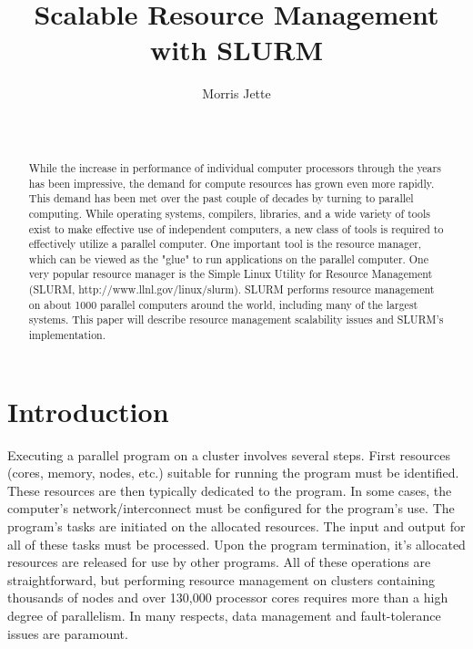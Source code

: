 \documentclass{../common/acm}
\def\ctit{Scalable Resource Management with SLURM}
\def\ucrl{UCRL-JC-TBD}
\def\auth{Morris Jette}
\def\pubdate{January 23, 2006}
\def\journal{Operating Systems Reviews}
\begin{document}

\title{\ctit}
\author{
\alignauthor Morris Jette\\
	\\
	\\
}

\maketitle
\begin{abstract}
While the increase in performance of individual computer
processors through the years has been impressive, the demand
for compute resources has grown even more rapidly.
This demand has been met over the past couple of decades by
turning to parallel computing.
While operating systems, compilers, libraries, and a wide
variety of tools exist to make effective use of independent
computers, a new class of tools is required to effectively
utilize a parallel computer.
One important tool is the resource manager, which can be viewed
as the "glue" to run applications on the parallel computer.
One very popular resource manager is the Simple Linux
Utility for Resource Management (SLURM,
http://www.llnl.gov/linux/slurm).
SLURM performs resource management on about 1000 parallel
computers around the world, including many of the largest
systems.
This paper will describe resource management scalability
issues and SLURM's implementation.
\end{abstract}


\section{Introduction}

Executing a parallel program on a cluster involves several
steps. First resources (cores, memory, nodes, etc.) suitable
for running the program must be identified. These resources
are then typically dedicated to the program. In some
cases, the computer's network/interconnect must be
configured for the program's use. The program's tasks
are initiated on the allocated resources. The input and
output for all of these tasks must be processed.
Upon the program termination, it's allocated resources
are released for use by other programs.
All of these operations are straightforward, but performing
resource management on clusters containing thousands of
nodes and over 130,000 processor cores requires more
than a high degree of parallelism.
In many respects, data management and fault-tolerance issues
are paramount.
\end{document}
